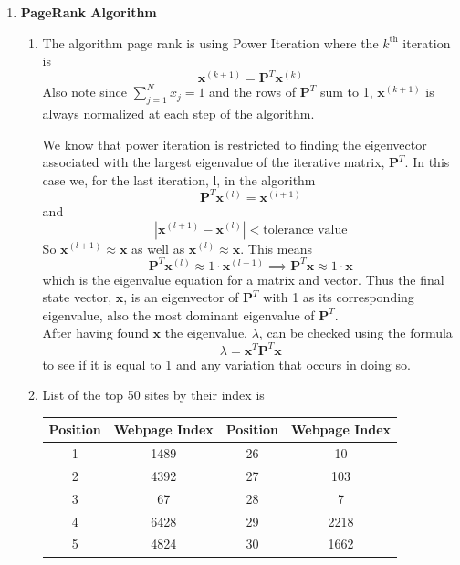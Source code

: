 \documentclass{article}
\begin{document}
\begin{enumerate}
	\item \textbf{PageRank Algorithm}
	\begin{enumerate}
		\item The algorithm page rank is using Power Iteration where the $k^\text{th}$ iteration is
		$$
			\textbf{x}^{(k+1)} = \textbf{P}^T \textbf{x}^{(k)}
		$$
		Also note since $\sum_{j=1}^N x_j = 1$ and the rows of $\textbf{P}^T$ sum to 1, $\textbf{x}^{(k+1)}$ is always normalized at each step of the algorithm.
		
		We know that power iteration is restricted to finding the eigenvector associated with the largest eigenvalue of the iterative matrix, $\textbf{P}^T$. In this case we, for the last iteration, l, in the algorithm
		 $$
		 	\textbf{P}^T \textbf{x}^{(l)} = \textbf{x}^{(l+1)}
		 $$
		 and 
		 $$
		 	|\textbf{x}^{(l+1)} - \textbf{x}^{(l)}| < \text{tolerance value}
		 $$
		 So $ \textbf{x}^{(l+1)} \approx \textbf{x}$ as well as $ \textbf{x}^{(l)} \approx \textbf{x}$. This means
		 $$
		 	\textbf{P}^T \textbf{x}^{(l)} \approx 1 \cdot \textbf{x}^{(l+1)} \implies \textbf{P}^T \textbf{x} \approx 1 \cdot \textbf{x}
		 $$
		 which is the eigenvalue equation for a matrix and vector. Thus the final state vector, $\textbf{x}$, is an eigenvector of $\textbf{P}^T$ with 1 as its corresponding eigenvalue, also the most dominant eigenvalue of $\textbf{P}^T$. \\
		 After having found $\textbf{x}$ the eigenvalue, $\lambda$, can be checked using the formula
		 $$
		 	\lambda = \textbf{x}	^T \textbf{P}^T \textbf{x}	 
		 $$
		 to see if it is equal to 1 and any variation that occurs in doing so.
		 \newpage
		\item List of the top 50 sites by their index is \\
			\begin{table}[h!]
			\centering
			\begin{tabular}{|c|c|c|c|} 
				\hline
				Position & Webpage Index & Position & Webpage Index \\
				\hline
				1 & 1489 & 26 & 10\\ 
				2 & 4392 & 27 & 103\\ 
				3 & 67 & 28 & 7\\ 
				4 & 6428 & 29 & 2218\\ 
				5 & 4824 & 30 & 1662\\ 

\end{tabular}
\end{table}
\end{enumerate}
\end{enumerate}
\end{document}
